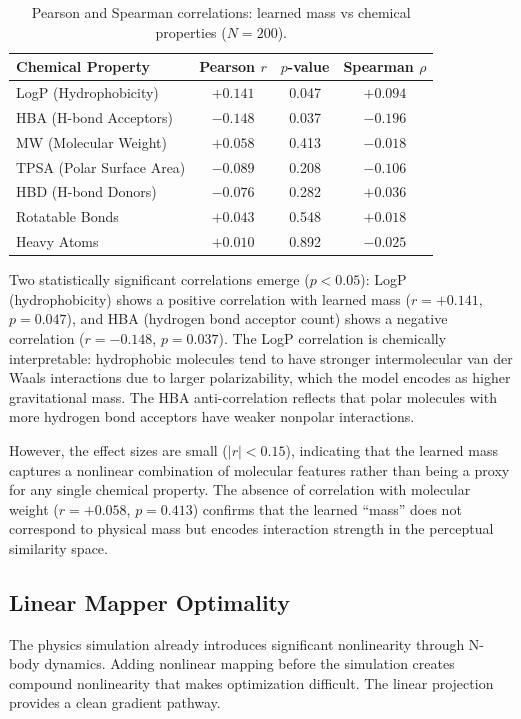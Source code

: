 \documentclass[11pt,a4paper]{article}
\begin{document}
\begin{table}[H]
\centering
\caption{Pearson and Spearman correlations: learned mass vs chemical properties ($N=200$).}
\label{tab:interp}
\begin{tabular}{lccc}
\toprule
Chemical Property & Pearson $r$ & $p$-value & Spearman $\rho$ \\
\midrule
LogP (Hydrophobicity) & $+0.141$ & 0.047 & $+0.094$ \\
HBA (H-bond Acceptors) & $-0.148$ & 0.037 & $-0.196$ \\
MW (Molecular Weight) & $+0.058$ & 0.413 & $-0.018$ \\
TPSA (Polar Surface Area) & $-0.089$ & 0.208 & $-0.106$ \\
HBD (H-bond Donors) & $-0.076$ & 0.282 & $+0.036$ \\
Rotatable Bonds & $+0.043$ & 0.548 & $+0.018$ \\
Heavy Atoms & $+0.010$ & 0.892 & $-0.025$ \\
\bottomrule
\end{tabular}
\end{table}

Two statistically significant correlations emerge ($p < 0.05$): LogP (hydrophobicity) shows a positive correlation with learned mass ($r = +0.141$, $p = 0.047$), and HBA (hydrogen bond acceptor count) shows a negative correlation ($r = -0.148$, $p = 0.037$). The LogP correlation is chemically interpretable: hydrophobic molecules tend to have stronger intermolecular van der Waals interactions due to larger polarizability, which the model encodes as higher gravitational mass. The HBA anti-correlation reflects that polar molecules with more hydrogen bond acceptors have weaker nonpolar interactions.

However, the effect sizes are small ($|r| < 0.15$), indicating that the learned mass captures a nonlinear combination of molecular features rather than being a proxy for any single chemical property. The absence of correlation with molecular weight ($r = +0.058$, $p = 0.413$) confirms that the learned ``mass'' does not correspond to physical mass but encodes interaction strength in the perceptual similarity space.

\subsection{Linear Mapper Optimality}
The physics simulation already introduces significant nonlinearity through N-body dynamics. Adding nonlinear mapping before the simulation creates compound nonlinearity that makes optimization difficult. The linear projection provides a clean gradient pathway.
\end{document}
